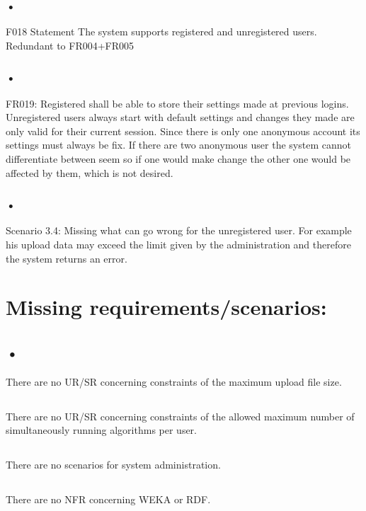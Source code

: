 \documentclass{article}
\begin{document}
\subsubsection{•}
F018 Statement The system supports registered and unregistered users.
Redundant to FR004+FR005

\subsubsection{•}
FR019: Registered shall be able to store their settings made at previous logins. Unregistered users always start with default settings and changes they made are only valid for their current session.
Since there is only one anonymous account its settings must always be fix. If there are two anonymous user the system cannot differentiate between seem so if one would make change the other one would be affected by them, which is not desired.

\subsubsection{•}
Scenario 3.4: Missing what can go wrong for the unregistered user. For example his upload data may exceed the limit given by the administration and therefore the system returns an error.

\section{Missing requirements/scenarios:}

\subsection{•}
There are no UR/SR concerning constraints of the maximum upload file size.
\subsection{}
There are no UR/SR concerning constraints of the allowed maximum number of simultaneously running algorithms per user.
\subsection{}
There are no scenarios for system administration.
\subsection{}
There are no NFR concerning WEKA or RDF.
\end{document}
